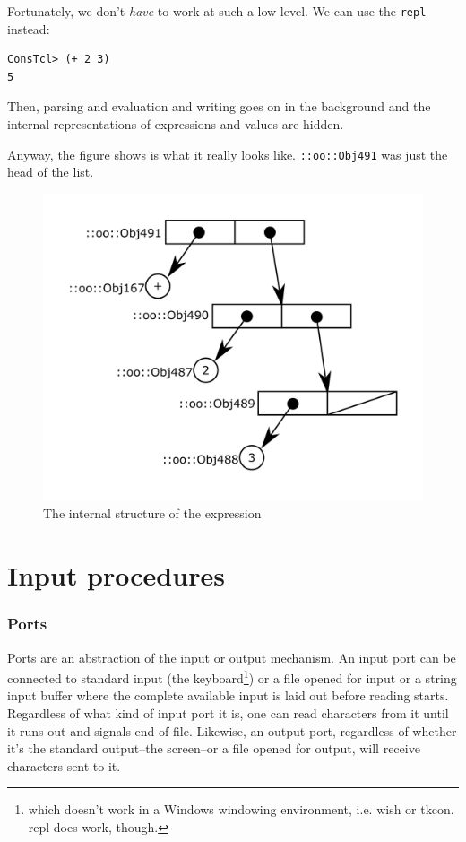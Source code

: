\documentclass[twoside,9pt]{report}
\begin{document}
Fortunately, we don't \emph{have} to work at such a low level. We can use the \texttt{repl} instead:

\begin{verbatim}
ConsTcl> (+ 2 3)
5
\end{verbatim}


Then, parsing and evaluation and writing goes on in the background and the internal representations of expressions and values are hidden.


Anyway, the figure shows is what it really looks like. \texttt{::oo::Obj491} was just the head of the list.

\begin{figure}[h!]\includegraphics{images/intreplist.png}\captionsetup{labelformat=empty}\caption{ The internal structure of the expression}\label{fig:-the-internal-structure-of-the-expression}\end{figure}
\section{Input procedures}
\label{input-procedures}

\begin{pulledtext}
\subsubsection{Ports}
\label{ports}


Ports are an abstraction of the input or output mechanism. An input port can be connected to standard input (the keyboard\footnote{which doesn't work in a Windows windowing environment, i.e. wish or tkcon. repl does work, though.}) or a file opened for input or a string input buffer where the complete available input is laid out before reading starts. Regardless of what kind of input port it is, one can read characters from it until it runs out and signals end-of-file. Likewise, an output port, regardless of whether it's the standard output--the screen--or a file opened for output, will receive characters sent to it.

\end{pulledtext}
\end{document}
